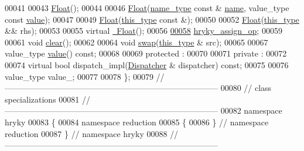 \begin{DoxyCode}
00041 
00043     \hyperlink{classhryky_1_1reduction_1_1_float_ac8301e6a6b997dc1142800282ad58fd3}{Float}();
00044 
00046     \hyperlink{classhryky_1_1reduction_1_1_float_ac8301e6a6b997dc1142800282ad58fd3}{Float}(\hyperlink{classhryky_1_1reduction_1_1_string}{name_type} \textcolor{keyword}{const} & \hyperlink{classhryky_1_1reduction_1_1_base_a842569265d741905eb8a353d3935f1d1}{name}, value\_type \textcolor{keyword}{const} \hyperlink{classhryky_1_1reduction_1_1_float_aa172d53821cd26856950b10f67ca658b}{value});
00047 
00049     \hyperlink{classhryky_1_1reduction_1_1_float_ac8301e6a6b997dc1142800282ad58fd3}{Float}(\hyperlink{classhryky_1_1reduction_1_1_base}{this_type} \textcolor{keyword}{const} &);
00050 
00052     \hyperlink{classhryky_1_1reduction_1_1_float_ac8301e6a6b997dc1142800282ad58fd3}{Float}(\hyperlink{classhryky_1_1reduction_1_1_base}{this_type} && rhs);
00053 
00055     \textcolor{keyword}{virtual} \hyperlink{classhryky_1_1reduction_1_1_float_a4f27def7ed62d71c89483de7daa4471c}{~Float}();
00056 
\hypertarget{reduction__float_8h_source_l00058}{}\hyperlink{classhryky_1_1reduction_1_1_float_a2fd470b897e136144c60d956c4407927}{00058}     \hyperlink{classhryky_1_1reduction_1_1_float_a2fd470b897e136144c60d956c4407927}{hryky_assign_op};
00059 
00061     \textcolor{keywordtype}{void} \hyperlink{classhryky_1_1reduction_1_1_float_a693fff0927a864c84f0f781148ce6882}{clear}();
00062 
00064     \textcolor{keywordtype}{void} \hyperlink{classhryky_1_1reduction_1_1_float_adf0505497af06bc65bcc3e24e6a5fd45}{swap}(\hyperlink{classhryky_1_1reduction_1_1_base}{this_type} & src);
00065 
00067     value\_type \hyperlink{classhryky_1_1reduction_1_1_float_aa172d53821cd26856950b10f67ca658b}{value}() \textcolor{keyword}{const};
00068 
00069 \textcolor{keyword}{protected} :
00070 
00071 \textcolor{keyword}{private} :
00072 
00074     \textcolor{keyword}{virtual} \textcolor{keywordtype}{bool} dispatch\_impl(\hyperlink{classhryky_1_1reduction_1_1_dispatcher}{Dispatcher} & dispatcher) \textcolor{keyword}{const};
00075 
00076     value\_type value\_;
00077 
00078 \};
00079 \textcolor{comment}{//
      ------------------------------------------------------------------------------}
00080 \textcolor{comment}{// class specializations}
00081 \textcolor{comment}{//
      ------------------------------------------------------------------------------}
00082 \textcolor{keyword}{namespace }hryky
00083 \{
00084 \textcolor{keyword}{namespace }reduction
00085 \{
00086 \} \textcolor{comment}{// namespace reduction}
00087 \} \textcolor{comment}{// namespace hryky}
00088 \textcolor{comment}{//
      ------------------------------------------------------------------------------}

\end{DoxyCode}

